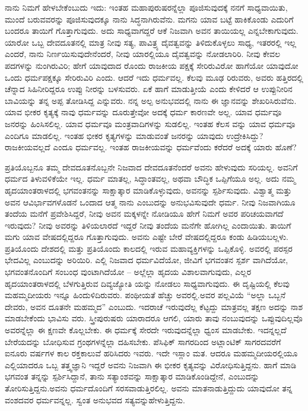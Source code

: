 ನಾನು ನಿಮಗೆ ಹೇಳಬೇಕೆಂಬುದು ಇದು: ಇಂತಹ ಮಹಾಪುರುಷರನ್ನೆಲ್ಲಾ ಪೂಜಿಸುವುದಕ್ಕೆ ನನಗೆ ಸಾಧ್ಯವಾಯಿತು, ಮುಂದೆ ಬರುವವರನ್ನು ಪೂಜಿಸುವುದಕ್ಕೂ ನಾನು ಸಿದ್ಧನಾಗಿರುವೆನು. ಮಗನು ಯಾವ ಬಟ್ಟೆ ಹಾಕಿಕೊಂಡು ಎದುರಿಗೆ ಬಂದರೂ ತಾಯಿಗೆ ಗೊತ್ತಾಗುವುದು. ಅದು ಸಾಧ್ಯವಾಗದ್ದರೆ ಆಕೆ ನಿಜವಾಗಿ ಅವನ ತಾಯಿಯಲ್ಲ ಎನ್ನಬೇಕಾಗುವುದು. ಯಾರೋ ಒಬ್ಬ ದೇವದೂತನಲ್ಲಿ ಮಾತ್ರ ನೀವು ಸತ್ಯ, ಪಾವಿತ್ರ್ಯ ದೈವತ್ವವನ್ನು ತಿಳಿದುಕೊಳ್ಳಲು ಸಾಧ್ಯ, ಇತರರಲ್ಲಿ ಇಲ್ಲ ಎಂದರೆ, ನಾನು ನಿರ್ಣಯಿಸುವುದೇನೆಂದರೆ, ನೀವು ಯಾರಲ್ಲಿಯೂ ದೈವತ್ವವನ್ನು ನೋಡಲಾರಿರಿ. ನೀವು ಕೇವಲ ಪದಗಳನ್ನು ನುಂಗಿರುವಿರಿ; ಹೇಗೆ ಯಾವುದಾದ ರೊಂದು ರಾಜಕೀಯ ಪಕ್ಷಕ್ಕೆ ಸೇರಿರುವಿರೋ ಹಾಗೆಯೋ ಯಾವುದೋ ಒಂದು ಧರ್ಮಪಕ್ಷಕ್ಕೂ ಸೇರಿರುವಿರಿ ಎಂದು. ಆದರೆ ಇದು ಧರ್ಮವಲ್ಲ. ಕೆಲವು ಮೂಢ ರಿರುವರು, ಅವರು ಹತ್ತಿರದಲ್ಲಿ ಚೆನ್ನಾದ ಸಿಹಿನೀರಿದ್ದರೂ ಉಪ್ಪು ನೀರನ್ನು ಬಳಸುವರು. ಏಕೆ ಹಾಗೆ ಮಾಡುತ್ತೀಯೆ ಎಂದು ಕೇಳಿದರೆ ಆ ಉಪ್ಪುನೀರಿನ ಬಾವಿಯನ್ನು ತನ್ನ ಅಪ್ಪ ತೋಡಿಸಿದ್ದ ಎನ್ನುವರು. ನನ್ನ ಅಲ್ಪ ಅನುಭವದಲ್ಲಿ ನಾನು ಈ ಜ್ಞಾನವನ್ನು ಶೇಖರಿಸಿರುವೆನು. ಯಾವ ಭೀಕರ ಕೃತ್ಯಕ್ಕೆ ನಾವು ಧರ್ಮವನ್ನು ದೂರುತ್ತೇವೋ ಅದಕ್ಕೆ ಧರ್ಮ ಕಾರಣವೇ ಅಲ್ಲ. ಯಾವ ಧರ್ಮವೂ ಜನರನ್ನು ಹಿಂಸಿಸಲಿಲ್ಲ. ಯಾವ ಧರ್ಮವೂ ಮಂತ್ರವಾದಿಗಳನ್ನು ಸುಡಲಿಲ್ಲ. ಇಂತಹ ಕೆಲಸ ವನ್ನು ಯಾವ ಧರ್ಮವೂ ಎಂದಿಗೂ ಮಾಡಲಿಲ್ಲ. ಇಂತಹ ಭೀಕರ ಕೃತ್ಯಗಳನ್ನು ಮಾಡುವಂತೆ ಜನರನ್ನು ಯಾವುದು ಉದ್ರೇಕಿಸಿದ್ದು? ರಾಜಕೀಯವಲ್ಲದೆ ಎಂದೂ ಧರ್ಮವಲ್ಲ. ಇಂತಹ ರಾಜಕೀಯವನ್ನು ಧರ್ಮವೆಂದು ಕರೆದರೆ ಅದಕ್ಕೆ ಯಾರು ಹೊಣೆ?

ಪ್ರತಿಯೊಬ್ಬನೂ ತಮ್ಮ ದೇವದೂತನೊಬ್ಬನೇ ನಿಜವಾದ ದೇವದೂತನೆಂದರೆ ಅವನು ಹೇಳುವುದು ಸರಿಯಲ್ಲ. ಅವನಿಗೆ ಧರ್ಮದ ತಿಳುವಳಿಕೆಯೇ ಇಲ್ಲ. ಧರ್ಮ ಮಾತಲ್ಲ, ಸಿದ್ಧಾಂತವಲ್ಲ, ಅಥವಾ ಬೌದ್ಧಿಕ ಒಪ್ಪಿಗೆಯೂ ಅಲ್ಲ. ಅದು ನಮ್ಮ ಹೃದಯಾಂತರಾಳದಲ್ಲಿ ಭಗವಂತನನ್ನು ಸಾಕ್ಷಾತ್ಕಾರ ಮಾಡಿಕೊಳ್ಳುವುದು, ಅವನನ್ನು ಸ್ಪರ್ಶಿಸುವುದು. ವಿಶ್ವಾತ್ಮ ಮತ್ತು ಅವನ ಆವಿರ್ಭಾವಗಳೊಡನೆ ಒಂದಾದ ಆತ್ಮ ನಾನು ಎಂಬುದನ್ನು ಅನುಭವಿಸುವುದೇ ಧರ್ಮ. ನೀವು ನಿಜವಾಗಿಯೂ ತಂದೆಯ ಮನೆಗೆ ಪ್ರವೇಶಿಸಿದ್ದರೆ, ನೀವು ಅವನ ಮಕ್ಕಳನ್ನೇ ನೋಡಿಯೂ ಹೇಗೆ ನಿಮಗೆ ಅವರ ಪರಿಚಯವಾಗದೆ ಇರುವುದು? ನೀವು ಅವರನ್ನು ತಿಳಿಯಲಾರದೆ ಇದ್ದರೆ ನೀವು ತಂದೆಯ ಮನೆಗೇ ಹೋಗಿಲ್ಲ ಎಂದಾಯಿತು. ತಾಯಿಗೆ ಮಗು ಯಾವ ವೇಷದಲ್ಲಿದ್ದರೂ ಗೊತ್ತಾಗುವುದು. ಅವನು ಎಷ್ಟೇ ಬೇರೆ ವೇಷದಲ್ಲಿದ್ದರೂ ಕಂಡು ಹಿಡಿಯಬಲ್ಲಳು. ಪ್ರತಿಯೊಂದು ದೇಶದಲ್ಲಿ ಮತ್ತು ಪ್ರತಿಯೊಂದು ಕಾಲದಲ್ಲಿ ಇರುವ ಮಹಾವ್ಯಕ್ತಿಗಳನ್ನು ಒಪ್ಪಿಕೊಳ್ಳಿ. ಅವರಲ್ಲಿ ಪರಸ್ಪರ ಭೇದವಿಲ್ಲ ಎಂಬುದನ್ನು ಅರಿಯಿರಿ. ಎಲ್ಲಿ ನಿಜವಾದ ಧರ್ಮವಿದೆಯೋ, ಜೀವಿಗೆ ಭಗವಂತನ ಸ್ಪರ್ಶ ವಾಗಿದೆಯೋ, ಭಗವಂತನೊಂದಿಗೆ ಸಂಬಂಧ ವುಂಟಾಗಿದೆಯೋ – ಅಲ್ಲೆಲ್ಲಾ ಹೃದಯ ವಿಶಾಲವಾಗುವುದು, ಎಲ್ಲರ ಹೃದಯಾಂತರಾಳದಲ್ಲಿ ಬೆಳಗುತ್ತಿರುವ ದಿವ್ಯಜ್ಯೋತಿ ಯನ್ನು ನೋಡಲು ಸಾಧ್ಯವಾಗುವುದು. ಈ ದೃಷ್ಟಿಯಲ್ಲಿ ಕೆಲವು ಮಹಮ್ಮದೀಯರು ಇನ್ನೂ ಹಿಂದುಳಿದಿರುವರು. ಪಂಥೀಯತೆ ಹೆಚ್ಚು ಅವರಲ್ಲಿ.ಅವರ ಪಲ್ಲವಿಯೆ “ಅಲ್ಲಾ ಒಬ್ಬನೆ ದೇವರು, ಅವನ ದೂತನೇ ಮಹಮ್ಮದ” ಎಂಬುದು. ಇದರಾಚೆ ಇರುವುದೆಲ್ಲ ಕೆಟ್ಟದ್ದು ಮಾತ್ರವಲ್ಲ ತಕ್ಷಣ ಅದನ್ನು ನಾಶ ಮಾಡಬೇಕೆಂದು ಭಾವಿಸು ವರು. ಸ್ತ್ರೀಪುರುಷರು ಯಾರಾದರೂ ಆಗಲಿ, ಯಾರು ತಾವು ನಂಬುವುದನ್ನು ಒಪ್ಪುವುದಿಲ್ಲವೊ ಅವರನ್ನೆಲ್ಲಾ ಈ ಕ್ಷಣವೇ ಕೊಲ್ಲಬೇಕು. ಈ ಧರ್ಮಕ್ಕೆ ಸೇರದೇ ಇರುವುದನ್ನೆಲ್ಲಾ ಧ್ವಂಸ ಮಾಡಬೇಕು. ಇದನ್ನಲ್ಲದೆ ಬೇರೆಯದನ್ನು ಬೋಧಿಸುವ ಗ್ರಂಥಗಳನ್ನೆಲ್ಲಾ ದಹಿಸಬೇಕು. ಪೆಸಿಫಿಕ್​ ಸಾಗರದಿಂದ ಅಟ್ಲಾಂಟಿಕ್​ ಸಾಗರದವರೆಗೆ ಐನೂರು ವರ್ಷಗಳ ಕಾಲ ರಕ್ತಕಾಲುವೆ ಹರಿಸಿದರು ಇವರು. ಇದೇ ಇಸ್ಲಾಂ ಮತ. ಆದರೂ ಮಹಮ್ಮದೀಯರಲ್ಲಿಯೂ ಎಲ್ಲಿಯಾದರೂ ಒಬ್ಬ ತತ್ತ್ವಜ್ಞಾನಿ ಇದ್ದರೆ ಅವನು ನಿಜವಾಗಿ ಈ ಭೀಕರ ಕೃತ್ಯವನ್ನು ವಿರೋಧಿಸುತ್ತಿದ್ದನು. ಹಾಗೆ ಮಾಡಿ ಭಗವಂತ ತನ್ನನ್ನು ಸ್ಪರ್ಶಿಸಿದ್ದಾನೆ, ತಾನು ಸತ್ಯಾಂಶವನ್ನು ಸಾಕ್ಷಾತ್ಕಾರ ಮಾಡಿಕೊಂಡಿದ್ದೇನೆ, ಎಂಬುದನ್ನು ತೋರಿಸುತ್ತಿದ್ದನು.ಅವನು ಧರ್ಮದೊಂದಿಗೆ ಸರಸವಾಡುತ್ತಿರಲಿಲ್ಲ. ಅವನು ಮಾತನಾಡುತ್ತಿದ್ದುದು ಯಾವುದೋ ತನ್ನ ವಂಶದವರ ಧರ್ಮವನ್ನಲ್ಲ. ಸ್ವಂತ ಅನುಭವದ ಸತ್ಯವನ್ನುಹೇಳುತ್ತಿದ್ದನು.

